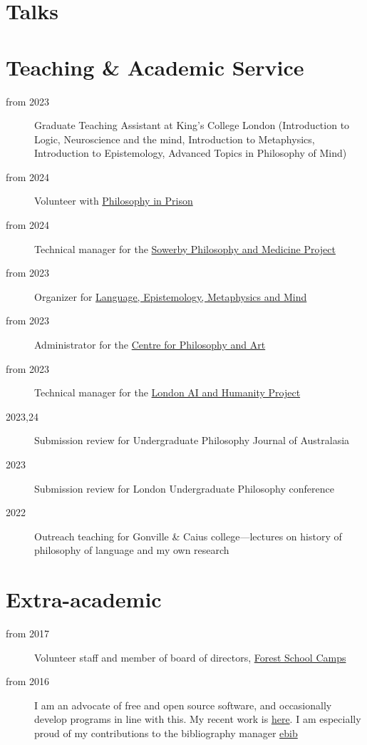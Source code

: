 \documentclass{cv}
\begin{document}
\section*{Talks}
\printbibliography[check=Presentation]{}

\section*{Teaching \& Academic Service}
\begin{description}
\item[{from 2023}] Graduate Teaching Assistant at King's College London
(Introduction to Logic, Neuroscience and the mind, Introduction to
Metaphysics, Introduction to Epistemology, Advanced Topics in
Philosophy of Mind)
\item[{from 2024}] Volunteer with \href{https://www.philosophyinprison.com/}{Philosophy in Prison}
\item[{from 2024}] Technical manager for the \href{https://www.philosophyandmedicine.org/}{Sowerby Philosophy and
Medicine Project}
\item[{from 2023}] Organizer for \href{https://www.lemm-london.co.uk/}{Language, Epistemology, Metaphysics and Mind}
\item[{from 2023}] Administrator for the \href{https://philosophyarts.co.uk/}{Centre for Philosophy and Art}
\item[{from 2023}] Technical manager for the \href{https://www.ai-humanity-london.com/}{London AI and Humanity Project}
\item[{2023,24}] Submission review for Undergraduate Philosophy Journal of
Australasia
\item[{2023}] Submission review for London Undergraduate Philosophy
conference
\item[{2022}] Outreach teaching for Gonville \& Caius college---lectures on
history of philosophy of language and my own research
\end{description}

\section*{Extra-academic}
\begin{description}
\item[{from 2017}] Volunteer staff and member of board of directors,
\href{https://www.fsc.org.uk/}{Forest School Camps}
\item[{from 2016}] I am an advocate of free and open source software, and
occasionally develop programs in line with this. My recent work is
\href{https://github.com/Hugo-Heagren}{here}. I am especially proud of my contributions to the bibliography
manager \href{https://joostkremers.github.io/ebib/}{ebib}
\end{description}
\end{document}

